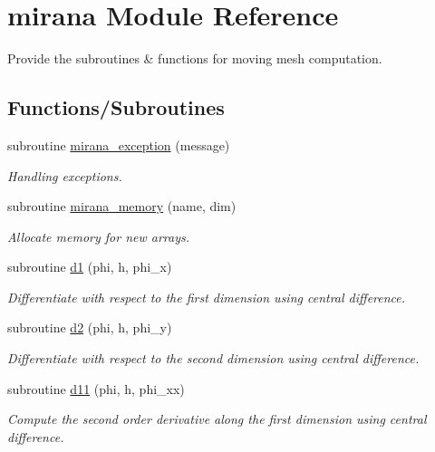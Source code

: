 \hypertarget{namespacemirana}{}\section{mirana Module Reference}
\label{namespacemirana}


Provide the subroutines \& functions for moving mesh computation.  


\subsection*{Functions/\+Subroutines}
\begin{DoxyCompactItemize}
\item 
subroutine \hyperlink{namespacemirana_ab002a22665f70b4c65bdcf70ac96d768}{mirana\+\_\+exception} (message)
\begin{DoxyCompactList}\small\item\em Handling exceptions. \end{DoxyCompactList}\item 
subroutine \hyperlink{namespacemirana_af7398bd6141d1b739721cefb235bf4c4}{mirana\+\_\+memory} (name, dim)
\begin{DoxyCompactList}\small\item\em Allocate memory for new arrays. \end{DoxyCompactList}\item 
subroutine \hyperlink{namespacemirana_a4009036e8b04ac992641e36d34ab0ed4}{d1} (phi, h, phi\+\_\+x)
\begin{DoxyCompactList}\small\item\em Differentiate with respect to the first dimension using central difference. \end{DoxyCompactList}\item 
subroutine \hyperlink{namespacemirana_a21348ffe170eafc6fc2a009256b1b6e3}{d2} (phi, h, phi\+\_\+y)
\begin{DoxyCompactList}\small\item\em Differentiate with respect to the second dimension using central difference. \end{DoxyCompactList}\item 
subroutine \hyperlink{namespacemirana_ab9b1e7b5e38c6a020e05196b452e6d02}{d11} (phi, h, phi\+\_\+xx)
\begin{DoxyCompactList}\small\item\em Compute the second order derivative along the first dimension using central difference. \end{DoxyCompactList}\item 

\end{DoxyCompactItemize}

